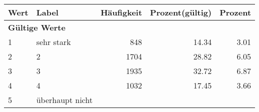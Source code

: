      \begin{longtable}{lXrrr}
     \toprule
     \textbf{Wert} & \textbf{Label} & \textbf{Häufigkeit} & \textbf{Prozent(gültig)} & \textbf{Prozent} \\
     \endhead
     \midrule
     \multicolumn{5}{l}{\textbf{Gültige Werte}}\\

     1 &
     \multicolumn{1}{X}{ sehr stark   } &


       \num{848} &
       \num[round-mode=places,round-precision=2]{14.34} &
         \num[round-mode=places,round-precision=2]{3.01} \\

     2 &
     \multicolumn{1}{X}{ 2   } &


       \num{1704} &
       \num[round-mode=places,round-precision=2]{28.82} &
         \num[round-mode=places,round-precision=2]{6.05} \\

     3 &
     \multicolumn{1}{X}{ 3   } &


       \num{1935} &
       \num[round-mode=places,round-precision=2]{32.72} &
         \num[round-mode=places,round-precision=2]{6.87} \\

     4 &
     \multicolumn{1}{X}{ 4   } &


       \num{1032} &
       \num[round-mode=places,round-precision=2]{17.45} &
         \num[round-mode=places,round-precision=2]{3.66} \\

     5 &
     \multicolumn{1}{X}{ überhaupt nicht   } &



\end{longtable}
